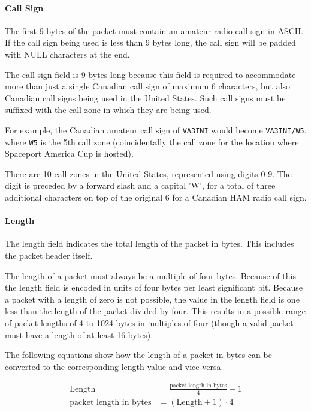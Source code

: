 \paragraph{Call Sign}
The first 9 bytes of the packet must contain an amateur radio call sign in ASCII. If the call sign being used is less
than 9 bytes long, the call sign will be padded with NULL characters at the end.

The call sign field is 9 bytes long because this field is required to accommodate more than just a single Canadian call
sign of maximum 6 characters, but also Canadian call signs being used in the United States. Such call signs must be
suffixed with the call zone in which they are being used. \cite{foreign-broadcast}

For example, the Canadian amateur call sign of \texttt{VA3INI} would become \texttt{VA3INI/W5}, where \texttt{W5} is
the 5th call zone (coincidentally the call zone for the location where Spaceport America Cup is hosted).

There are 10 call zones in the United States, represented using digits 0-9. \cite{us-callzones} The digit is preceded
by a forward slash and a capital 'W', for a total of three additional characters on top of the original 6 for a
Canadian HAM radio call sign.

\paragraph{Length}
The length field indicates the total length of the packet in bytes. This includes the packet header itself.

The length of a packet must always be a multiple of four bytes. Because of this the length field is encoded in units of
four bytes per least significant bit. Because a packet with a length of zero is not possible, the value in the length
field is one less than the length of the packet divided by four. This results in a possible range of packet lengths of
4 to 1024 bytes in multiples of four (though a valid packet must have a length of at least 16 bytes).

The following equations show how the length of a packet in bytes can be converted to the corresponding length value and
vice versa.

\begin{align*}
    \text{Length}                 & = \frac{\text{packet length in bytes}}{4} - 1 \\
    \text{packet length in bytes} & = \left(\text{Length} + 1\right) \cdot 4
\end{align*}

